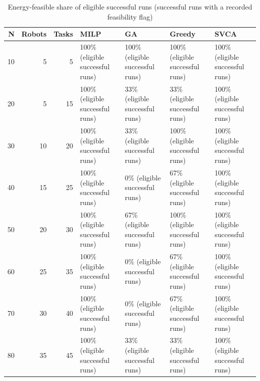 \begin{table}[htbp]
\centering
\small
\caption{Energy-feasible share of eligible successful runs (successful runs with a recorded feasibility flag)}
\label{tab:sample_demo_energy_feasibility}
\begin{tabular}{rrrllll}
\hline
N & Robots & Tasks & MILP & GA & Greedy & SVCA \\
\hline
10 & 5 & 5 & 100\% (eligible successful runs) & 100\% (eligible successful runs) & 100\% (eligible successful runs) & 100\% (eligible successful runs) \\
20 & 5 & 15 & 100\% (eligible successful runs) & 33\% (eligible successful runs) & 33\% (eligible successful runs) & 100\% (eligible successful runs) \\
30 & 10 & 20 & 100\% (eligible successful runs) & 33\% (eligible successful runs) & 100\% (eligible successful runs) & 100\% (eligible successful runs) \\
40 & 15 & 25 & 100\% (eligible successful runs) & 0\% (eligible successful runs) & 67\% (eligible successful runs) & 100\% (eligible successful runs) \\
50 & 20 & 30 & 100\% (eligible successful runs) & 67\% (eligible successful runs) & 100\% (eligible successful runs) & 100\% (eligible successful runs) \\
60 & 25 & 35 & 100\% (eligible successful runs) & 0\% (eligible successful runs) & 67\% (eligible successful runs) & 100\% (eligible successful runs) \\
70 & 30 & 40 & 100\% (eligible successful runs) & 0\% (eligible successful runs) & 67\% (eligible successful runs) & 100\% (eligible successful runs) \\
80 & 35 & 45 & 100\% (eligible successful runs) & 33\% (eligible successful runs) & 33\% (eligible successful runs) & 100\% (eligible successful runs) \\
\hline
\end{tabular}
\end{table}
